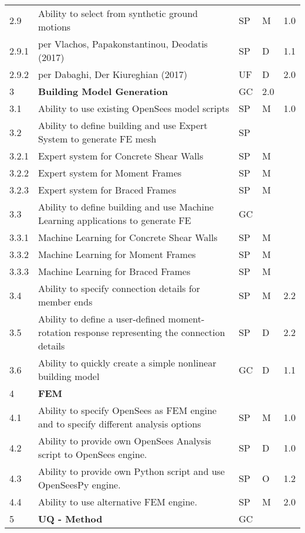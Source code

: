 \begin{longtable}{| p{} | p{} | p{} | p{} |  p{} |}
      2.9 & Ability to select from synthetic ground motions & SP & M & 1.0  \\
      2.9.1 & per Vlachos, Papakonstantinou, Deodatis (2017) & SP & D & 1.1  \\ 
      2.9.2 & per Dabaghi, Der Kiureghian (2017) & UF & D & 2.0 \\ \hline
	3 & \textbf{Building Model Generation} & GC & 2.0 \\ \hline
	3.1 & Ability to use existing OpenSees model scripts & SP & M & 1.0 \\ \hline
	3.2  & Ability to define building and use Expert System to generate FE mesh & SP & &  \\ \hline
	3.2.1 & Expert system for Concrete Shear Walls & SP & M &  \\ \hline
	3.2.2 & Expert system for Moment Frames & SP & M &  \\ \hline
	3.2.3 & Expert system for  Braced Frames & SP & M &   \\ \hline
	3.3 & Ability to define building and use Machine Learning applications to generate FE & GC &  &  \\ \hline
	3.3.1 & Machine Learning for Concrete Shear Walls & SP & M &  \\ \hline
	3.3.2 & Machine Learning for Moment Frames & SP & M &  \\ \hline
	3.3.3 & Machine Learning for Braced Frames & SP & M &   \\ \hline
	3.4 & Ability to specify connection details for member ends & SP & M & 2.2 \\ \hline
	3.5 & Ability to define a user-defined moment-rotation response representing the connection details & SP & D & 2.2 \\ \hline
	3.6 & Ability to quickly create a simple nonlinear building model & GC & D & 1.1 \\ \hline
	4 & \textbf{FEM} &  &  \\ \hline
	4.1 & Ability to specify OpenSees as FEM engine and to specify different analysis options & SP & M & 1.0 \\ \hline
	4.2 & Ability to provide own OpenSees Analysis script to OpenSees engine. & SP & D & 1.0 \\ \hline
	4.3 & Ability to provide own Python script and use OpenSeesPy engine. & SP & O & 1.2 \\ \hline
	4.4 & Ability to use alternative FEM engine. & SP & M & 2.0 \\ \hline
	5 & \textbf{UQ - Method} &  GC &  \\ \hline

\end{longtable}

